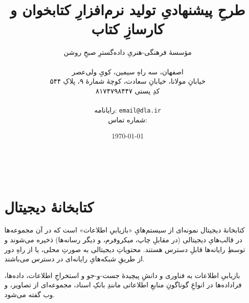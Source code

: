 \documentclass[]{article}
\begin{document}
\title{طرحِ پیشنهادیِ تولید نرم‌افزارِ کتابخوان و کارسازِ کتاب}
\author{
مؤسسهٔ فرهنگی-هنریِ داده‌گسترِ صبحِ روشن\\\\
اصفهان، سه راهِ سیمین، کویِ ولی‌عصر\\ خیابانِ مولانا، خیابانِ سعادت، کوچهٔ شمارهٔ ۹، پلاکِ ۵۴۴\\
کدِ پستی ۸۱۷۴۷۹۸۴۴۷\\\\
رایانامه: 
\texttt{email@dla.ir}\\
شماره تماس: 
}
\date{\today}
\maketitle
‎\newpage
\tableofcontents
\newpage


\section{کتابخانهٔ دیجیتال}
کتابخانهٔ دیجیتال نمونه‌ای از سیستم‌هایِ «بازیابیِ اطلاعات»
است که در آن مجموعه‌ها در قالب‌هایِ دیجیتالی (در مقابلِ چاپ، میکروفرم، و دیگر رسانه‌ها) ذخیره می‌شوند و توسطِ رایانه‌ها قابلِ دسترس هستند. محتویاتِ دیجیتالی به صورتِ محلی، یا از راهِ دور از طریقِ شبکه‌هایِ رایانه‌ای در دسترس می‌باشند.

بازیابیِ اطلاعات به فناوری و دانشِ پیچیدهٔ جست-و-جو و استخراجِ اطلاعات، داده‌ها، فراداده‌ها در انواعِ گوناگونِ منابعِ اطلاعاتی مانندِ بانکِ اسناد، مجموعه‌ای از تصاویر، و وب گفته می‌شود.
\end{document}

